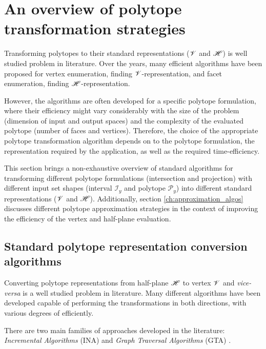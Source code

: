 \section{An overview of polytope transformation strategies} 
\label{ch:polytope_algorithms}

Transforming polytopes to their standard representations ($\mathscr{V}$ and $\mathscr{H}$) is well studied problem in literature. Over the years, many efficient algorithms  \cite{bremner_fukuda_marzetta_1998,fukuda_dd,avis_pivoting_nodate} have been proposed for vertex enumeration, finding $\mathscr{V}$-representation, and facet enumeration, finding $\mathscr{H}$-representation. 

However, the algorithms are often developed for a specific polytope formulation, where their efficiency might vary considerably with the size of the problem (dimension of input and output spaces)\cite{avis_comparative_2015} and the complexity of the evaluated polytope (number of faces and vertices)\cite{Dyer1983}. Therefore, the choice of the appropriate polytope transformation algorithm depends on to the polytope formulation, the representation required by the application, as well as the required time-efficiency.

This section brings a non-exhaustive overview of standard algorithms for transforming different polytope formulations (intersection and projection) with different input set shapes (interval $\mathcal{I}_y$ and polytope $\mathcal{P}_y$) into different standard representations ($\mathscr{V}$ and $\mathscr{H}$). Additionally, section \ref{ch:approximation_algos} discusses different polytope approximation strategies in the context of improving the efficiency of the vertex and half-plane evaluation.

\subsection{Standard polytope representation conversion algorithms}
\label{ch:standard_represtantion_conversion}

Converting polytope representations from half-plane $\mathscr{H}$ to vertex $\mathscr{V}$ and \textit{vice-versa} is a well studied problem in literature. Many different algorithms have been developed capable of performing the transformations in both directions, with various degrees of efficiently. 

There are two main families of approaches developed in the literature: \textit{Incremental Algorithms} (INA) and \textit{Graph Traversal Algorithms} (GTA) \cite[Chapter 8.]{fukuda2016lecture} \cite{avis1997how}.

